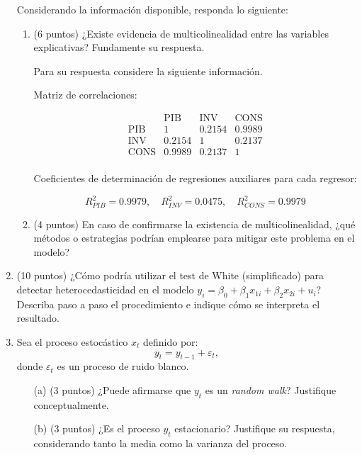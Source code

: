 \documentclass[10pt,a4paper]{article}
\begin{document}
\begin{enumerate}
Considerando la información disponible, responda lo siguiente:

\begin{enumerate}
    \item(6 puntos) ¿Existe evidencia de multicolinealidad entre las variables explicativas? Fundamente su respuesta.

Para su respuesta considere la siguiente información.

    Matriz de correlaciones:

    \[
    \begin{array}{c|ccc}
    & \text{PIB} & \text{INV} & \text{CONS} \\
    \hline
    \text{PIB} & 1 & 0.2154 & 0.9989 \\
    \text{INV} & 0.2154 & 1 & 0.2137 \\
    \text{CONS} & 0.9989 & 0.2137 & 1 \\
    \end{array}
    \]

    Coeficientes de determinación de regresiones auxiliares para cada regresor:

    \[
    R_{PIB}^2 = 0.9979, \quad R_{INV}^2 = 0.0475, \quad R_{CONS}^2 = 0.9979
    \]

    \item (4 puntos) En caso de confirmarse la existencia de multicolinealidad, ¿qué métodos o estrategias podrían emplearse para mitigar este problema en el modelo?
\end{enumerate}

\item (10 puntos)
¿Cómo podría utilizar el test de White (simplificado) para detectar heterocedasticidad en el modelo \( y_i = \beta_0 + \beta_1 x_{1i} + \beta_2 x_{2i} + u_i \)? Describa paso a paso el procedimiento e indique cómo se interpreta el resultado.


\item  Sea el proceso estocástico \( x_t \) definido por:
\[
y_t = y_{t-1} + \varepsilon_t,
\]
donde \( \varepsilon_t \) es un proceso de ruido blanco. 

\begin{enumerate}
    \item[(a)] (3 puntos) ¿Puede afirmarse que \( y_t \) es un \textit{random walk}? Justifique conceptualmente.
    
    \item[(b)]  (3 puntos) ¿Es el proceso \( y_t \) estacionario? Justifique su respuesta, considerando tanto la media como la varianza del proceso.
    

\end{enumerate}
\end{enumerate}
\end{document}
